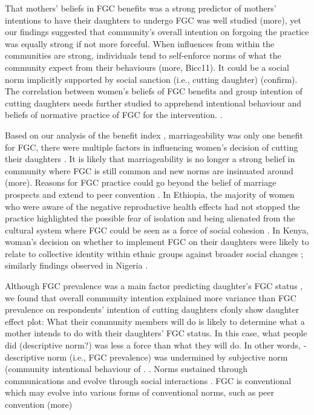 \documentclass[12pt,]{article}
\begin{document}
That mothers’ beliefs in FGC benefits was a strong predictor of mothers' intentions to have their daughters to undergo FGC was well studied \cite{PashPonn16} (more), yet our findings suggested that community’s overall intention on forgoing the practice was equally strong if not more forceful.  When influences from within the communities are strong, individuals tend to self-enforce norms of what the community expect from their behaviours \cite{Hayf05, KandNwak09, Mack96, Mack06, MackLeJe08} (more, Bicc11).  It could be a social norm implicitly supported by social sanction (i.e., cutting daughter) \cite{Bicchieri06, MackLeJe08} (confirm).  The correlation between women’s beliefs of FGC benefits and group intention of cutting daughters needs further studied to apprehend intentional behaviour and beliefs of normative practice of FGC for the intervention. .

Based on our analysis of the benefit index , marriageability was only one benefit for FGC, there were multiple factors in influencing women’s decision of cutting their daughters \cite{MackLeJe08}.  It is likely that marriageability is no longer a strong belief in community where FGC is still common and new norms are insinuated around \cite{EffeVogt15, ShelWand11} (more).  Reasons for FGC practice could go beyond the belief of marriage prospects and extend to peer convention \cite{ShelWand11}.  
In Ethiopia, the majority of women who were aware of the negative reproductive health effects had not stopped the practice highlighted the possible fear of isolation and being alienated from the cultural system where FGC could be seen as a force of social cohesion \cite{YirgKass12}.  In Kenya, woman's decision on whether to implement FGC on their daughters were likely to relate to collective identity within ethnic groups against broader social changes \cite{Achi14, Hayf05}; similarly findings observed in Nigeria \cite{FreyJohn07, KandMwek09}.

Although FGC prevalence was a main factor predicting daughter’s FGC status \cite{BoylSvec19} , we found that overall community intention explained more variance than FGC prevalence on respondents’ intention of cutting daughters cfonly{ show daughter effect plot}:  What their community members will do is likely to determine what a mother intends to do with their daughters’ FGC status. In this case, what people did (descriptive norm?) was less a force than what they will do.  In other words, - descriptive norm (i.e., FGC prevalence) was undermined by subjective norm (community intentional behaviour of . .  Norms sustained through communications and evolve through social interactions \cite{FishAjze10, RimaLapi15}.   FGC is conventional \cite{FreyJohn07, Hayf05, KandShel19, Mack96, ShelWand11} which may evolve into various forms of conventional norms, such as peer convention \cite{GrosHayd19 (confirm), ShelWand11} (more)
\end{document}
